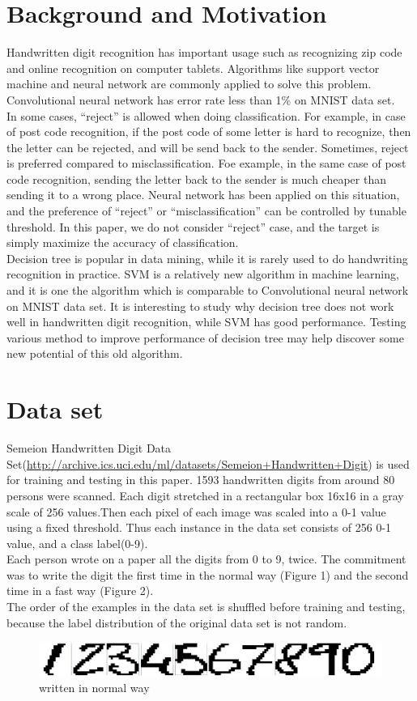 \documentclass[a4paper,11pt]{article}
\begin{document}
\section{Background and Motivation}
Handwritten digit recognition has important usage such as recognizing zip code and online recognition on computer tablets. Algorithms like support vector machine and neural network are commonly applied to solve this problem. Convolutional neural network has error rate less than 1\% on MNIST data set\cite{lecun98}. \\
In some cases, ``reject'' is allowed when doing classification. For example, in case of post code recognition, if the post code of some letter is hard to recognize, then the letter can be rejected, and will be send back to the sender. Sometimes, reject is preferred compared to misclassification. Foe example, in the same case of post code recognition, sending the letter back to the sender is much cheaper than sending it to a wrong place. Neural network has been applied on this situation, and the preference of ``reject'' or ``misclassification'' can be controlled by tunable threshold\cite{slg92}. In this paper, we do not consider ``reject'' case, and the target is simply maximize the accuracy of classification.\\
Decision tree is popular in data mining, while it is rarely used to do handwriting recognition in practice. SVM is a relatively new algorithm in machine learning, and it is one the algorithm which is comparable to Convolutional neural network on MNIST data set\cite{lecun98}. It is interesting to study why decision tree does not work well in handwritten digit recognition, while SVM has good performance. Testing various method to improve performance of decision tree may help discover some new potential of this old algorithm.
\section{Data set}
Semeion Handwritten Digit Data Set(\url{http://archive.ics.uci.edu/ml/datasets/Semeion+Handwritten+Digit}) is used for training and testing in this paper. 1593 handwritten digits from around 80 persons were scanned. Each digit stretched in a rectangular box 16x16 in a gray scale of 256 values.Then each pixel of each image was scaled into a 0-1 value using a fixed threshold. Thus each instance in the data set consists of 256 0-1 value, and a class label(0-9).\\
Each person wrote on a paper all the digits from 0 to 9, twice. The commitment was to write the digit the first time in the normal way (Figure 1) and the second time in a fast way (Figure 2). \\
The order of the examples in the data set is shuffled before training and testing, because the label distribution of the original data set is not random.
\begin{figure}
\centering
\includegraphics[width=1.0\textwidth]{clear}
\caption{written in normal way}
\end{figure}
\end{document}
